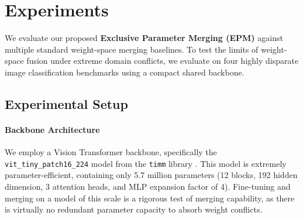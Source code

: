 \section{Experiments}
\label{submission:experiments}

We evaluate our proposed \textbf{Exclusive Parameter Merging (EPM)} against multiple standard weight-space merging baselines. To test the limits of weight-space fusion under extreme domain conflicts, we evaluate on four highly disparate image classification benchmarks using a compact shared backbone.

\subsection{Experimental Setup}

\paragraph{Backbone Architecture}
We employ a Vision Transformer backbone, specifically the \texttt{vit\_tiny\_patch16\_224} model from the \texttt{timm} library \cite{wightman2019timm}. This model is extremely parameter-efficient, containing only 5.7 million parameters (12 blocks, 192 hidden dimension, 3 attention heads, and MLP expansion factor of 4). Fine-tuning and merging on a model of this scale is a rigorous test of merging capability, as there is virtually no redundant parameter capacity to absorb weight conflicts.

